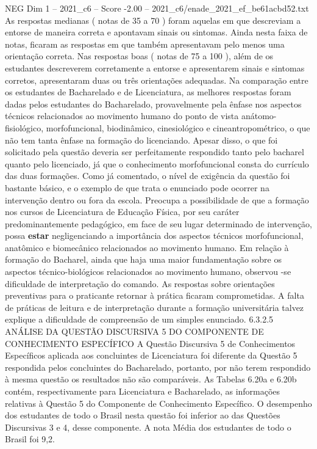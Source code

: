 \begin{textsample}{NEG Dim 1 – 2021\_c6 – Score -2.00 – 2021\_c6/enade\_2021\_ef\_be61acbd52.txt}
As respostas medianas ( notas de 35 a 70 ) foram aquelas em que descreviam a entorse de maneira correta e apontavam sinais ou sintomas.
Ainda nesta faixa de notas, ficaram as respostas em que também apresentavam pelo menos uma orientação correta.
Nas respostas boas ( notas de 75 a 100 ), além de os estudantes descreverem corretamente a entorse e apresentarem sinais e sintomas corretos, apresentaram duas ou três orientações adequadas.
Na comparação entre os estudantes de Bacharelado e de Licenciatura, as melhores respostas foram dadas pelos estudantes do Bacharelado, provavelmente pela ênfase nos aspectos técnicos relacionados ao movimento humano do ponto de vista anátomo-fisiológico, morfofuncional, biodinâmico, cinesiológico e cineantropométrico, o que não tem tanta ênfase na formação do licenciando.
Apesar disso, o que foi solicitado pela questão deveria ser perfeitamente respondido tanto pelo bacharel quanto pelo licenciado, já que o conhecimento morfofuncional consta do currículo das duas formações.
Como já comentado, o nível de exigência da questão foi bastante básico, e o exemplo de que trata o enunciado pode ocorrer na intervenção dentro ou fora da escola.
Preocupa a possibilidade de que a formação nos cursos de Licenciatura de Educação Física, por seu caráter predominantemente pedagógico, em face de seu lugar determinado de intervenção, possa \textbf{estar} negligenciando a importância dos aspectos técnicos morfofuncional, anatômico e biomecânico relacionados ao movimento humano.
Em relação à formação do Bacharel, ainda que haja uma maior fundamentação sobre os aspectos técnico-biológicos relacionados ao movimento humano, observou -se dificuldade de interpretação do comando.
As respostas sobre orientações preventivas para o praticante retornar à prática ficaram comprometidas.
A falta de práticas de leitura e de interpretação durante a formação universitária talvez explique a dificuldade de compreensão de um simples enunciado. 6.3.2.5 ANÁLISE DA QUESTÃO DISCURSIVA 5 DO COMPONENTE DE CONHECIMENTO ESPECÍFICO A Questão Discursiva 5 de Conhecimentos Específicos aplicada aos concluintes de Licenciatura foi diferente da Questão 5 respondida pelos concluintes do Bacharelado, portanto, por não terem respondido à mesma questão os resultados não são comparáveis.
As Tabelas 6.20a e 6.20b contém, respectivamente para Licenciatura e Bacharelado, as informações relativas à Questão 5 do Componente de Conhecimento Específico.
O desempenho dos estudantes de todo o Brasil nesta questão foi inferior ao das Questões Discursivas 3 e 4, desse componente.
A nota Média dos estudantes de todo o Brasil foi 9,2.

\end{textsample}
